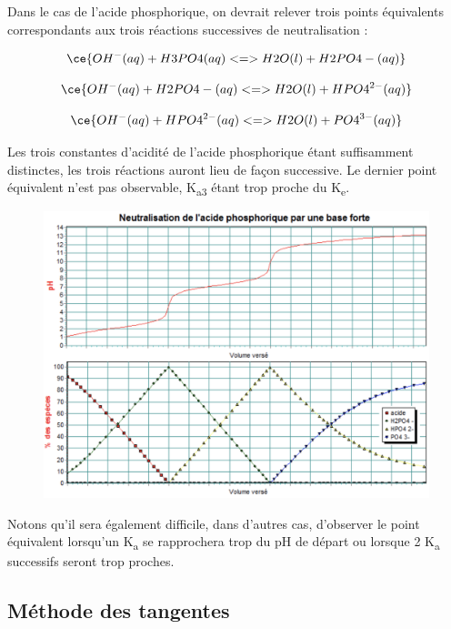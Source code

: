 \documentclass[
  11pt,
  french,
  a4paper,
  openany]{book}
\begin{document}
Dans le cas de l'acide phosphorique, on devrait relever trois points équivalents correspondants aux trois réactions successives de neutralisation :

\[
\ce{OH^{-}(aq) + H3PO4(aq) <=> H2O(l) + H2PO4-(aq)}
\]

\[
\ce{OH^{-}(aq) + H2PO4-(aq) <=> H2O(l) + HPO4^{2-}(aq)}
\]

\[
\ce{OH^{-}(aq) + HPO4^{2-}(aq) <=> H2O(l) + PO4^{3-}(aq)}
\]

Les trois constantes d'acidité de l'acide phosphorique étant suffisamment distinctes, les trois réactions auront lieu de façon successive. Le dernier point équivalent n'est pas observable, K\textsubscript{a3} étant trop proche du K\textsubscript{e}.

\begin{figure}

{\centering \includegraphics[width=1\linewidth]{images/acides-bases-6d} 

}

\end{figure}

Notons qu'il sera également difficile, dans d'autres cas, d'observer le point équivalent lorsqu'un K\textsubscript{a} se rapprochera trop du pH de départ ou lorsque 2 K\textsubscript{a} successifs seront trop proches.

\hypertarget{muxe9thode-des-tangentes}{%
\subsection{Méthode des tangentes}\label{muxe9thode-des-tangentes}}
\end{document}
